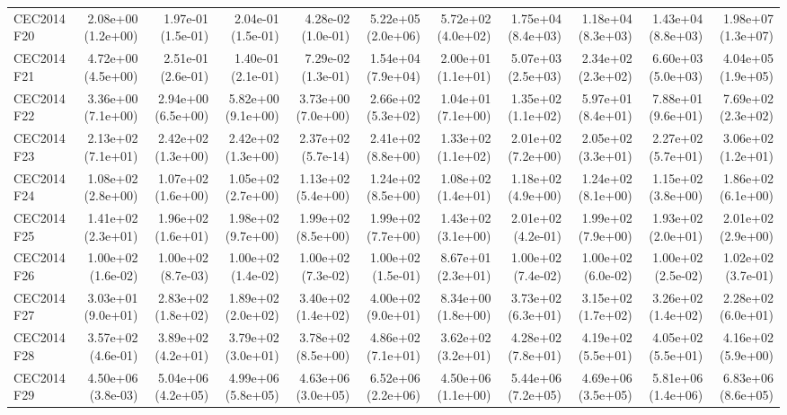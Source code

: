 \begin{longtable}{lrrrrrrrrrr}
CEC2014 F20 & 2.08e+00 (1.2e+00) & 1.97e-01 (1.5e-01) & 2.04e-01 (1.5e-01) & 4.28e-02 (1.0e-01) & 5.22e+05 (2.0e+06) & 5.72e+02 (4.0e+02) & 1.75e+04 (8.4e+03) & 1.18e+04 (8.3e+03) & 1.43e+04 (8.8e+03) & 1.98e+07 (1.3e+07) \\
CEC2014 F21 & 4.72e+00 (4.5e+00) & 2.51e-01 (2.6e-01) & 1.40e-01 (2.1e-01) & 7.29e-02 (1.3e-01) & 1.54e+04 (7.9e+04) & 2.00e+01 (1.1e+01) & 5.07e+03 (2.5e+03) & 2.34e+02 (2.3e+02) & 6.60e+03 (5.0e+03) & 4.04e+05 (1.9e+05) \\
CEC2014 F22 & 3.36e+00 (7.1e+00) & 2.94e+00 (6.5e+00) & 5.82e+00 (9.1e+00) & 3.73e+00 (7.0e+00) & 2.66e+02 (5.3e+02) & 1.04e+01 (7.1e+00) & 1.35e+02 (1.1e+02) & 5.97e+01 (8.4e+01) & 7.88e+01 (9.6e+01) & 7.69e+02 (2.3e+02) \\
CEC2014 F23 & 2.13e+02 (7.1e+01) & 2.42e+02 (1.3e+00) & 2.42e+02 (1.3e+00) & 2.37e+02 (5.7e-14) & 2.41e+02 (8.8e+00) & 1.33e+02 (1.1e+02) & 2.01e+02 (7.2e+00) & 2.05e+02 (3.3e+01) & 2.27e+02 (5.7e+01) & 3.06e+02 (1.2e+01) \\
CEC2014 F24 & 1.08e+02 (2.8e+00) & 1.07e+02 (1.6e+00) & 1.05e+02 (2.7e+00) & 1.13e+02 (5.4e+00) & 1.24e+02 (8.5e+00) & 1.08e+02 (1.4e+01) & 1.18e+02 (4.9e+00) & 1.24e+02 (8.1e+00) & 1.15e+02 (3.8e+00) & 1.86e+02 (6.1e+00) \\
CEC2014 F25 & 1.41e+02 (2.3e+01) & 1.96e+02 (1.6e+01) & 1.98e+02 (9.7e+00) & 1.99e+02 (8.5e+00) & 1.99e+02 (7.7e+00) & 1.43e+02 (3.1e+00) & 2.01e+02 (4.2e-01) & 1.99e+02 (7.9e+00) & 1.93e+02 (2.0e+01) & 2.01e+02 (2.9e+00) \\
CEC2014 F26 & 1.00e+02 (1.6e-02) & 1.00e+02 (8.7e-03) & 1.00e+02 (1.4e-02) & 1.00e+02 (7.3e-02) & 1.00e+02 (1.5e-01) & 8.67e+01 (2.3e+01) & 1.00e+02 (7.4e-02) & 1.00e+02 (6.0e-02) & 1.00e+02 (2.5e-02) & 1.02e+02 (3.7e-01) \\
CEC2014 F27 & 3.03e+01 (9.0e+01) & 2.83e+02 (1.8e+02) & 1.89e+02 (2.0e+02) & 3.40e+02 (1.4e+02) & 4.00e+02 (9.0e+01) & 8.34e+00 (1.8e+00) & 3.73e+02 (6.3e+01) & 3.15e+02 (1.7e+02) & 3.26e+02 (1.4e+02) & 2.28e+02 (6.0e+01) \\
CEC2014 F28 & 3.57e+02 (4.6e-01) & 3.89e+02 (4.2e+01) & 3.79e+02 (3.0e+01) & 3.78e+02 (8.5e+00) & 4.86e+02 (7.1e+01) & 3.62e+02 (3.2e+01) & 4.28e+02 (7.8e+01) & 4.19e+02 (5.5e+01) & 4.05e+02 (5.5e+01) & 4.16e+02 (5.9e+00) \\
CEC2014 F29 & 4.50e+06 (3.8e-03) & 5.04e+06 (4.2e+05) & 4.99e+06 (5.8e+05) & 4.63e+06 (3.0e+05) & 6.52e+06 (2.2e+06) & 4.50e+06 (1.1e+00) & 5.44e+06 (7.2e+05) & 4.69e+06 (3.5e+05) & 5.81e+06 (1.4e+06) & 6.83e+06 (8.6e+05) \\

\end{longtable}
